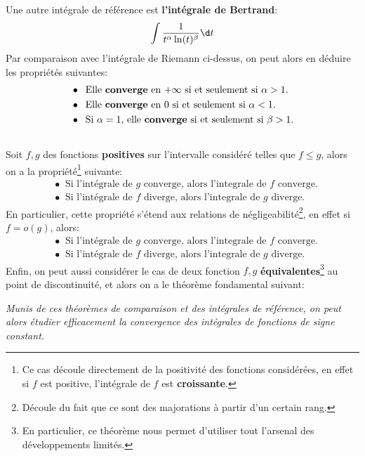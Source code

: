 Une autre intégrale de référence est \textbf{l'intégrale de Bertrand}:
\[
   \int \frac{1}{t^\alpha \ln(t)^\beta} \d t   
\]
Par comparaison avec l'intégrale de Riemann ci-dessus, on peut alors en déduire les propriétés suivantes:
\begin{align*}
   &\bullet \;\; \text{Elle \textbf{converge} en \(+\infty\) si et seulement si \(\alpha > 1\).} \\
   &\bullet \;\; \text{Elle \textbf{converge} en \(0\) si et seulement si \(\alpha < 1\).} \\
   &\bullet \;\; \text{Si \(\alpha = 1\), elle \textbf{converge} si et seulement si \(\beta > 1\).}
\end{align*}
\subsection*{}
Soit \(f, g\) des fonctions \textbf{positives} sur l'intervalle considéré telles que \(f \leq g\), alors on a la propriété\footnote[1]{Ce cas découle directement de la positivité des fonctions considérées, en effet si \(f\) est positive, l'intégrale de \(f\) est \textbf{croissante}.} suivante:
\begin{align*}
   &\bullet \;\; \text{Si l'intégrale de \(g\) converge, alors l'integrale de \(f\) converge.} \\
   &\bullet \;\; \text{Si l'intégrale de \(f\) diverge, alors l'integrale de \(g\) diverge.}
\end{align*}
En particulier, cette propriété s'étend aux relations de négligeabilité\footnote[2]{Découle du fait que ce sont des majorations à partir d'un certain rang.}, en effet si \(f = o(g)\), alors:
\begin{align*}
   &\bullet \;\; \text{Si l'intégrale de \(g\) converge, alors l'integrale de \(f\) converge.} \\
   &\bullet \;\; \text{Si l'intégrale de \(f\) diverge, alors l'integrale de \(g\) diverge.}
\end{align*}
Enfin, on peut aussi considérer le cas de deux fonction \(f, g\) \textbf{équivalentes}\footnote[3]{En particulier, ce théorème nous permet d'utiliser tout l'arsenal des développements limités.} au point de discontinuité, et alors on a le théorème fondamental suivant:
\begin{center}
   \textit{Munis de ces théorèmes de comparaison et des intégrales de référence, on peut alors étudier efficacement la convergence des intégrales de fonctions de signe constant.}
\end{center}
